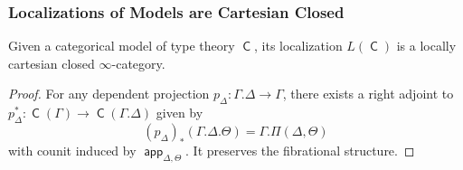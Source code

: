 \documentclass{beamer}
\DeclareMathOperator{\sfC}{\mathsf{C}}
\DeclareMathOperator{\app}{\mathsf{app}}
\begin{document}
\begin{frame}
  \frametitle{Localizations of Models are Cartesian Closed}

  \begin{thm}[Kapulkin 2015]
    Given a categorical model of type theory $\sfC$, its localization
    $L(\sfC)$ is a locally cartesian closed $\infty$-category.
  \end{thm}
  \begin{proof}
    For any dependent projection $p_\Delta\colon\Gamma.\Delta\rightarrow\Gamma$,
    there exists a right adjoint to
    $p_\Delta^*\colon\sfC(\Gamma)\rightarrow\sfC(\Gamma.\Delta)$ given by
    \[(p_\Delta)_*(\Gamma.\Delta.\Theta)=\Gamma.\Pi(\Delta,\Theta)\]
    with counit induced by $\app_{\Delta,\Theta}$. It preserves the fibrational
    structure.
  \end{proof}
\end{frame}

\begin{frame}
\end{frame}
\end{document}

